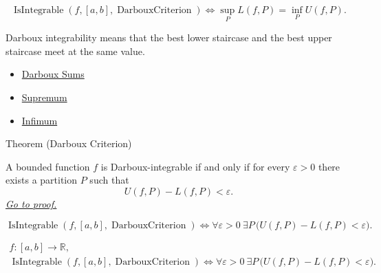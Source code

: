 \begin{remark*}
\[
\operatorname{IsIntegrable}(f,[a,b],\operatorname{DarbouxCriterion})
\Longleftrightarrow
\sup_P L(f,P)=\inf_P U(f,P).
\]
\end{remark*}

\begin{remark*}[Interpretation]
Darboux integrability means that the best lower staircase and the best upper
staircase meet at the same value.
\end{remark*}

\begin{dependencies}
\begin{itemize}
  \item \hyperref[def:darboux-sums]{Darboux Sums}
  \item \hyperref[def:supremum]{Supremum}
  \item \hyperref[def:infimum]{Infimum}
\end{itemize}
\end{dependencies}

\begin{theorembox}{Theorem (Darboux Criterion)}
\begin{theorem}
\label{thm:darboux-criterion}
A bounded function \(f\) is Darboux-integrable if and only if for every
\(\varepsilon>0\) there exists a partition \(P\) such that
\[
  U(f,P)-L(f,P)<\varepsilon.
\]
\hyperref[prf:darboux-criterion]{\textit{Go to proof.}}
\end{theorem}
\end{theorembox}

\begin{remark*}
\[
\operatorname{IsIntegrable}(f,[a,b],\operatorname{DarbouxCriterion})
\Longleftrightarrow
\forall\varepsilon>0\ \exists P\,
\bigl(U(f,P)-L(f,P)<\varepsilon\bigr).
\]
\end{remark*}

\begin{remark*}
\[
\begin{aligned}
  f\colon [a,b]\to\mathbb{R},\\
\operatorname{IsIntegrable}(f,[a,b],\operatorname{DarbouxCriterion})
\Longleftrightarrow
\forall\varepsilon>0\ \exists P\,
\bigl(U(f,P)-L(f,P)<\varepsilon\bigr).
\end{aligned}
\]
\end{remark*}

